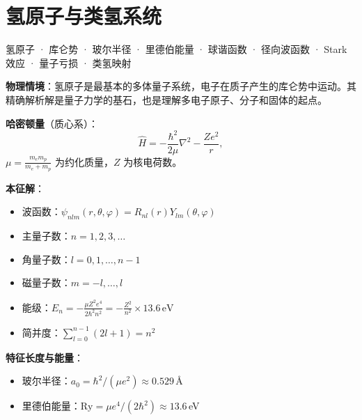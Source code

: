 
\section{氢原子与类氢系统}
\label{sec:hydrogen-atom}

\begin{tipbox}[关键词标签]
氢原子 · 库仑势 · 玻尔半径 · 里德伯能量 · 球谐函数 · 径向波函数 · Stark效应 · 量子亏损 · 类氢映射
\end{tipbox}

\begin{modelbox}[模型：库仑势中的束缚态]
\textbf{物理情境}：氢原子是最基本的多体量子系统，电子在质子产生的库仑势中运动。其精确解析解是量子力学的基石，也是理解多电子原子、分子和固体的起点。

\textbf{哈密顿量}（质心系）：
\[
\hat H=-\frac{\hbar^2}{2\mu}\nabla^2-\frac{Ze^2}{r},
\]
$\mu=\frac{m_em_p}{m_e+m_p}$ 为约化质量，$Z$ 为核电荷数。

\textbf{本征解}：
\begin{itemize}[nosep]
    \item 波函数：$\psi_{nlm}(r,\theta,\varphi)=R_{nl}(r)Y_{lm}(\theta,\varphi)$
    \item 主量子数：$n=1,2,3,\ldots$
    \item 角量子数：$l=0,1,\ldots,n-1$
    \item 磁量子数：$m=-l,\ldots,l$
    \item 能级：$\displaystyle E_n=-\frac{\mu Z^2e^4}{2\hbar^2n^2}=-\frac{Z^2}{n^2}\times13.6\,\text{eV}$
    \item 简并度：$\sum_{l=0}^{n-1}(2l+1)=n^2$
\end{itemize}

\textbf{特征长度与能量}：
\begin{itemize}[nosep]
    \item 玻尔半径：$a_0=\hbar^2/(\mu e^2)\approx0.529\,$\AA
    \item 里德伯能量：$\text{Ry}=\mu e^4/(2\hbar^2)\approx13.6\,$eV
\end{itemize}
\end{modelbox}

